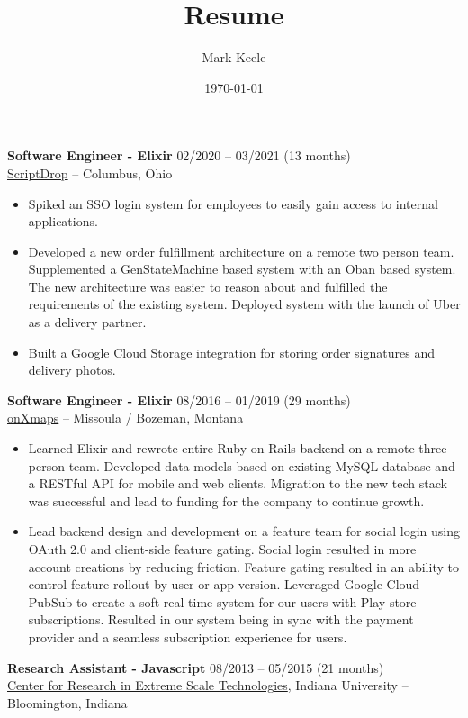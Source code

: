 \documentclass[12pt,letterpaper]{article}
\author{Mark Keele}
\title{Resume}
\date{\today}
\begin{document}
\noindent\textbf{Software Engineer - Elixir}
\hfill{02/2020 -- 03/2021 (13 months)} \\
\href{https://scriptdrop.co/}{ScriptDrop} -- Columbus, Ohio

\begin{itemize}

  \item Spiked an SSO login system for employees to easily gain access to internal applications.

  \item Developed a new order fulfillment architecture on a remote two person team. Supplemented a GenStateMachine based system with an Oban based system. The new architecture was easier to reason about and fulfilled the requirements of the existing system. Deployed system with the launch of Uber as a delivery partner.

  \item Built a Google Cloud Storage integration for storing order signatures and delivery photos.

\end{itemize}

\noindent\textbf{Software Engineer - Elixir}
\hfill{08/2016 -- 01/2019 (29 months)} \\
\href{https://www.onxmaps.com/}{onXmaps} -- Missoula / Bozeman, Montana

\begin{itemize}

  \item Learned Elixir and rewrote entire Ruby on Rails backend on a remote three person team. Developed data models based on existing MySQL database and a RESTful API for mobile and web clients. Migration to the new tech stack was successful and lead to funding for the company to continue growth.

  \item Lead backend design and development on a feature team for social login using OAuth 2.0 and client-side feature gating. Social login resulted in more account creations by reducing friction. Feature gating resulted in an ability to control feature rollout by user or app version. Leveraged Google Cloud PubSub to create a soft real-time system for our users with Play store subscriptions. Resulted in our system being in sync with the payment provider and a seamless subscription experience for users.

\end{itemize}

\noindent\textbf{Research Assistant - Javascript}
\hfill{08/2013 -- 05/2015 (21 months)} \\
\href{https://pti.iu.edu/centers/crest.html}{Center for Research in Extreme Scale Technologies}, Indiana University -- Bloomington, Indiana
\end{document}
